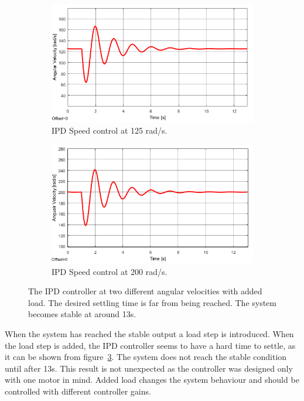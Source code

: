 \begin{figure}[h!]
	\centering
	\begin{subfigure}[b]{0.45\textwidth}
		\includegraphics[width=\textwidth]{graphics/IPD_load125}
		\caption{IPD Speed control at 125 rad/s.}
		\label{fig:ipdload125}
	\end{subfigure}
	\begin{subfigure}[b]{0.45\textwidth}
		\includegraphics[width=\textwidth]{graphics/IPD_load200}
		\caption{IPD Speed control at 200 rad/s.}
		\label{fig:ipdload200}
	\end{subfigure}
	\caption[The IPD controller at two different angular velocities with added load.]{The IPD controller at two different angular velocities with added load. The desired settling time is far from being reached. The system becomes stable at around 13s.}
	\label{fig:ipdload}
\end{figure}

When the system has reached the stable output a load step is introduced.
When the load step is added, the IPD controller seems to have a hard time to settle, as it can be shown from figure~\ref{fig:ipdload}. The system does not reach the stable condition until after 13s.
This result is not unexpected as the controller was designed only with one motor in mind.
Added load changes the system behaviour and should be controlled with different controller gains.
